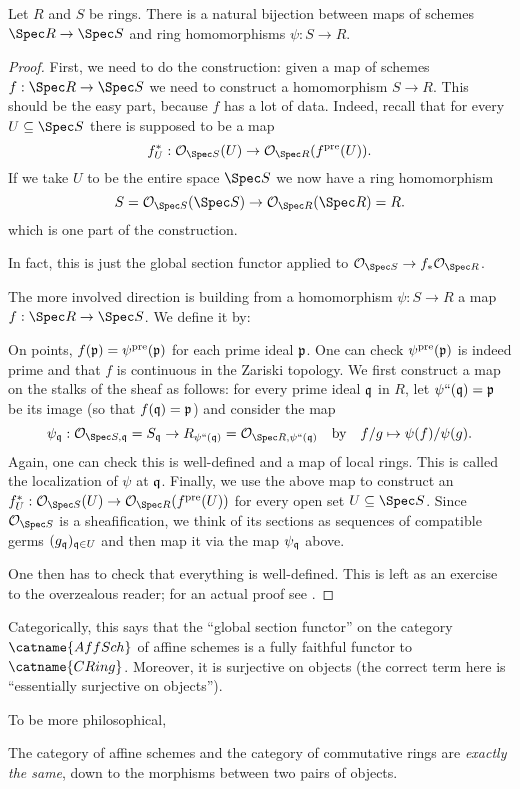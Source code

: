\begin{theorem}
	Let $R$ and $S$ be rings.
	There is a natural bijection between maps of schemes $\Spec R \to \Spec S$	
	and ring homomorphisms $\psi : S \to R$.
\end{theorem}
\begin{proof}
	First, we need to do the construction:
	given a map of schemes $f : \Spec R \to \Spec S$ 
	we need to construct a homomorphism $S \to R$.
	This should be the easy part, because $f$ has a lot of data.
	Indeed, recall that for every $U \subseteq \Spec S$
	there is supposed to be a map
	\[ f^\ast_U : \OO_{\Spec S} (U) \to \OO_{\Spec R}(f\pre(U)). \]
	If we take $U$ to be the entire space $\Spec S$ we now have a ring homomorphism
	\[ S = \OO_{\Spec S} (\Spec S) \to \OO_{\Spec R} (\Spec R) = R. \]
	which is one part of the construction.

	In fact, this is just the global section functor
	applied to $\OO_{\Spec S} \to f_\ast \OO_{\Spec R}$.

	The more involved direction is building from a homomorphism
	$\psi : S \to R$ a map $f : \Spec R \to \Spec S$.
	We define it by:
	\begin{itemize}
		\ii On points, $f(\mathfrak p) = \psi^{\text{pre}}(\mathfrak p)$ for each prime ideal $\mathfrak p$.
		One can check $\psi^{\text{pre}}(\mathfrak p)$ is indeed prime
		and that $f$ is continuous in the Zariski topology.
		\ii We first construct a map on the stalks of the sheaf as follows:
		for every prime ideal $\mathfrak q$ in $R$, let $\psi``(\mathfrak q) = \mathfrak p$ be its image
		(so that $f(\mathfrak q) = \mathfrak p$) and consider the map
		\[ \psi_\qq : \OO_{\Spec S, \qq} = S_{\qq}
			\to R_{\psi``(\qq)} = \OO_{\Spec R, \psi``(\qq)}
			\quad\text{by}\quad f/g \mapsto \psi(f)/\psi(g). \]
		Again, one can check this is well-defined and a map of local rings.
		This is called the localization of $\psi$ at $\mathfrak q$.
		\ii Finally, we use the above map to construct an
		$f^\ast_U : \OO_{\Spec S}(U) \to \OO_{\Spec R}(f\pre(U))$
		for every open set  $U \subseteq \Spec S$.
		Since $\OO_{\Spec S}$ is a sheafification, we think of its
		sections as sequences of compatible germs $(g_\mathfrak q)_{\mathfrak q \in U}$
		and then map it via the map $\psi_\mathfrak q$ above.
	\end{itemize}
	One then has to check that everything is well-defined.
	This is left as an exercise to the overzealous reader;
	for an actual proof see \cite[Proposition 6.3.2]{ref:vakil}.
\end{proof}
\begin{remark}
	Categorically, this says that the ``global section functor''
	on the category $\catname{AffSch}$ of affine schemes is a
	fully faithful functor to $\catname{CRing}$.
	Moreover, it is surjective on objects
	(the correct term here is ``essentially surjective on objects'').
\end{remark}
To be more philosophical,
\begin{moral}
	The category of affine schemes and the
	category of commutative rings are \emph{exactly the same},
	down to the morphisms between two pairs of objects.
\end{moral}


